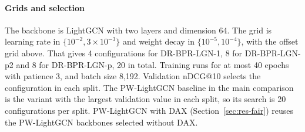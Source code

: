 \paragraph{Grids and selection} The backbone is LightGCN with two layers and dimension 64. The grid is learning rate in $\{10^{-2}, 3\times10^{-3}\}$
and weight decay in $\{10^{-5}, 10^{-4}\}$, with the offset grid above. That gives 4 configurations for DR-BPR-LGN-1, 8 for DR-BPR-LGN-p2 and 8
for DR-BPR-LGN-p, 20 in total. Training runs for at most 40 epochs with patience 3, and batch size 8,192. Validation nDCG@10 selects the
configuration in each split. The PW-LightGCN baseline in the main comparison is the variant with the largest validation value in each split,
so its search is 20 configurations per split. PW-LightGCN with DAX (Section~\ref{sec:res-fair}) reuses the PW-LightGCN backbones selected without DAX.
